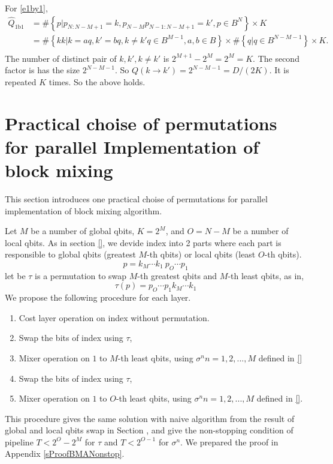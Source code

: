 \documentclass[a4paper]{article}
\newcommand{\cbr}[1]{\left\{#1\right\}}
\begin{document}
For \eqref{e1by1},
\begin{align*}
 \hat{Q}_{\text{1b1}} &= \# \cbr{p| p_{N:N-M+1} = k, p_{N-M}p_{N-1:N-M+1} = k', p\in B^N} \times K\\
&= \# \cbr{kk| k = aq, k'=bq, k\neq k' q\in B^{M-1},a, b\in B}\times \#\cbr{q| q\in B^{N-M-1}}\times K.\\
\end{align*}
 The number of distinct pair of \(k, k', k\neq k'\) is \(2^{M+1} - 2^M = 2^M = K\).  The second factor is has the size \(2^{N-M-1}\). So \( Q(k\to k') = 2^{N-M-1} = D/(2K)\). It is repeated \(K\) times. So the above holds.

\section{Practical choise of permutations for parallel Implementation of block mixing}
\label{sPracticalChoise}
This section introduces one practical choise of permutations for parallel implementation of block mixing algorithm.

Let \(M\) be a number of global qbits, \(K = 2^M\), and \(O = N-M\) be a number of local qbits. As in section \ref{}, we devide index into 2 parts where each part is responsible to global qbits (greatest \(M\)-th qbits)  or local qbits (least \(O\)-th qbits).
\[
p = k_M\cdots k_1\ p_O\cdots p_1
\]
let be \(\tau\) is a permutation to swap \(M\)-th greatest qbits and \(M\)-th least qbits, as in,
\[
\tau(p) = p_O\cdots p_1 k_M\cdots k_1
\]
We propose the following procedure for each layer.
\begin{enumerate}
    \item Cost layer operation on index without permutation.
    \item Swap the bits of index using \(\tau\), 
    \item Mixer operation on \(1\) to \(M\)-th least qbits, using \(\sigma^n n=1,2,...,M\) defined in \eqref{}
    \item Swap the bits of index using \(\tau\),
    \item Mixer operation on \(1\) to \(O\)-th least qbits, using \(\sigma^n n=1,2,...,M\) defined in \eqref{}.
\end{enumerate}
This procedure gives the same solution with naive algorithm from the result of global and local qbits swap in Section {}, and give the non-stopping condition of pipeline \(T < 2^{O}- 2^M\) for \(\tau\) and \(T < 2^{O-1}\) for \(\sigma^n\). We prepared the proof in Appendix \ref{sProofBMANonstop}.
\end{document}

